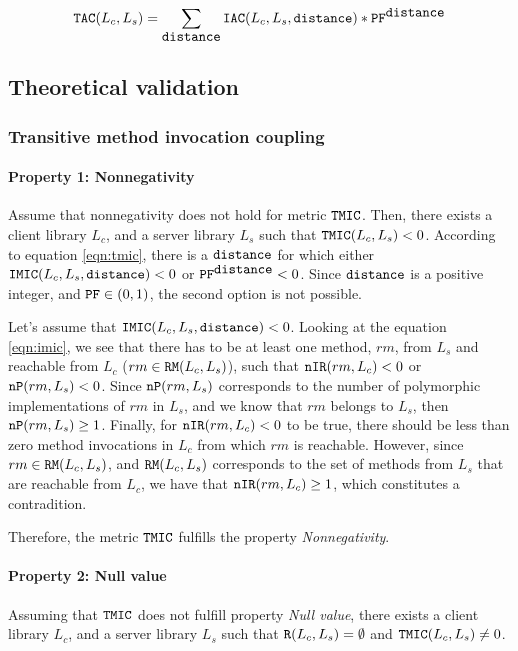 \begin{equation}
\label{eqn:tac}
  \verb|TAC|(L_c,L_s) = \sum_{\verb|distance|} \verb|IAC|(L_c,L_s, \verb|distance|) * \verb|PF|^{\verb|distance|}
\end{equation}

\subsection{Theoretical validation}

\subsubsection{Transitive method invocation coupling}

\paragraph{Property 1: Nonnegativity}
Assume that nonnegativity does not hold for metric $\verb|TMIC|$. Then, there exists a client library $L_c$, and a server library $L_s$ such that $\verb|TMIC|(L_c, L_s) < 0$. According to equation \ref{eqn:tmic}, there is a $\verb|distance|$ for which either $\verb|IMIC|(L_c,L_s, \verb|distance|) < 0$ or $\verb|PF|^{\verb|distance|} < 0$. Since $\verb|distance|$ is a positive integer, and $\verb|PF| \in (0,1)$, the second option is not possible.

Let's assume that $\verb|IMIC|(L_c,L_s, \verb|distance|) < 0$. Looking at the equation \ref{eqn:imic}, we see that there has to be at least one method, $rm$, from $L_s$ and reachable from $L_c$ ($rm \in \verb|RM|(L_c,L_s)$), such that $\verb|nIR|(rm,L_c) < 0$ or $\verb|nP|(rm, L_s) < 0$. Since $\verb|nP|(rm, L_s)$ corresponds to the number of polymorphic implementations of $rm$ in $L_s$, and we know that $rm$ belongs to $L_s$, then $\verb|nP|(rm, L_s) \geq 1$. Finally, for $\verb|nIR|(rm,L_c) < 0$ to be true, there should be less than zero method invocations in $L_c$ from which $rm$ is reachable. However, since $rm \in \verb|RM|(L_c,L_s)$, and $\verb|RM|(L_c,L_s)$ corresponds to the set of methods from $L_s$ that are reachable from $L_c$, we have that $\verb|nIR|(rm,L_c) \geq 1$, which constitutes a contradition.

Therefore, the metric $\verb|TMIC|$ fulfills the property \textit{Nonnegativity}.

\paragraph{Property 2: Null value}
Assuming that $\verb|TMIC|$ does not fulfill property \textit{Null value}, there exists a client library $L_c$, and a server library $L_s$ such that $\verb|R|(L_c, L_s) = \emptyset$ and $\verb|TMIC|(L_c, L_s) \neq 0$.


